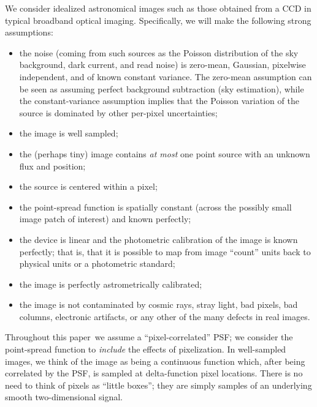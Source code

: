 \documentclass[11pt,letterpaper,linenumbers]{aastex7}
\newcommand{\doctype}{paper}
\newcommand{\changed}[1]{#1}
\begin{document}
We consider idealized astronomical images such as those obtained from
a CCD in typical broadband optical imaging.
\changed{Specifically, we will make the following strong assumptions:}
\begin{itemize}
\item the noise (coming from such sources as the Poisson distribution
  of the sky background, dark current, and read noise) is zero-mean,
  Gaussian, pixelwise independent, and of known constant variance.  The
  zero-mean assumption can be seen as assuming perfect background
  subtraction (sky estimation), \changed{while the constant-variance assumption implies
  that the Poisson variation of the source is dominated by other per-pixel uncertainties;}
\item the image is well sampled;
\item the (perhaps tiny) image contains \emph{at most} one point
  source with an unknown flux and position;
\item the source is centered within a pixel; %
\item the point-spread function is spatially constant (across the
  possibly small image patch of interest) and known perfectly;
\item the device is linear and the photometric calibration of the
  image is known perfectly; that is, that it is possible to map from
  image ``count'' units back to physical units or a photometric
  standard;
\item the image is perfectly astrometrically calibrated;
\item the image is not contaminated by cosmic rays, stray light, bad
  pixels, bad columns, electronic artifacts, or any other of the many
  defects in real images.
\end{itemize}

Throughout this \doctype\ we assume a ``pixel-correlated'' PSF; we
consider the point-spread function to \emph{include} the effects of
pixelization.  In well-sampled images, we think of the image as being
a continuous function which, after being correlated by the PSF, is
sampled at delta-function pixel locations.  There is no need to think
of pixels as ``little boxes''; they are simply samples of an
underlying smooth two-dimensional signal.

\end{document}
